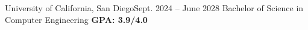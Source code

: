 \resumeSubHeadingListStart
  \resumeSubheading
    {University of California, San Diego}{Sept. 2024 -- June 2028}
    {Bachelor of Science in Computer Engineering}{ \textbf{GPA: 3.9/4.0}}
\resumeSubHeadingListEnd